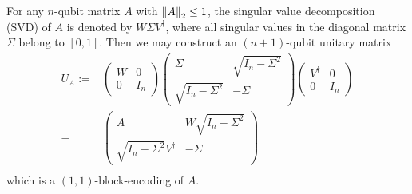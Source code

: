 \begin{exam}\label{exam:be11}
For any $n$-qubit matrix $A$ with $\left\lVert A\right\rVert_2\le 1$, the singular value decomposition (SVD) of $A$ is denoted by $W\Sigma V^{\dag}$, where all singular values in the diagonal matrix $\Sigma$ belong to $[0,1]$. Then we may construct an $(n+1)$-qubit unitary matrix
\begin{equation}
\begin{split}
U_A:=&\left(\begin{array}{cc}
W & 0 \\
0 & I_{n}
\end{array}\right)\left(\begin{array}{cc}
\Sigma & \sqrt{I_{n}-\Sigma^{2}} \\
\sqrt{I_{n}-\Sigma^{2}} & -\Sigma
\end{array}\right)\left(\begin{array}{cc}
V^{\dagger} & 0 \\
0 & I_{n}
\end{array}\right)\\
=&\left(\begin{array}{cc}
A &  W \sqrt{I_{n}-\Sigma^{2}} \\
\sqrt{I_{n}-\Sigma^{2}} V^{\dagger} & -\Sigma
\end{array}\right)\\
\end{split}
\end{equation}
which is a $(1,1)$-block-encoding of $A$. 
\end{exam}


